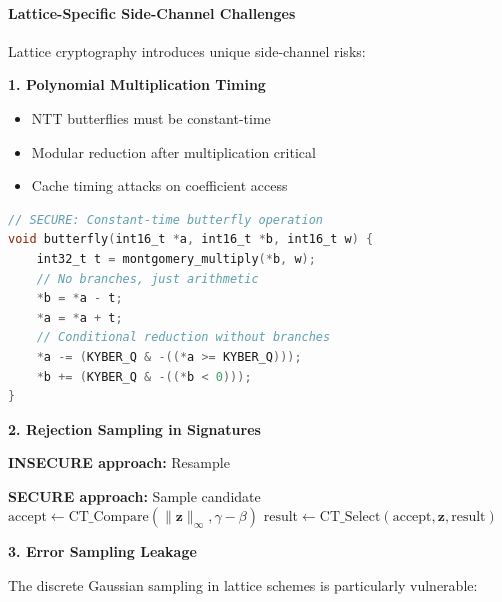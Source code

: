 \documentclass[11pt,a4paper]{article}
\begin{document}
\paragraph{Lattice-Specific Side-Channel Challenges}

Lattice cryptography introduces unique side-channel risks:

\textbf{1. Polynomial Multiplication Timing}
\begin{itemize}
    \item NTT butterflies must be constant-time
    \item Modular reduction after multiplication critical
    \item Cache timing attacks on coefficient access
\end{itemize}

\begin{lstlisting}[language=C, caption=Constant-Time NTT Butterfly]
// SECURE: Constant-time butterfly operation
void butterfly(int16_t *a, int16_t *b, int16_t w) {
    int32_t t = montgomery_multiply(*b, w);
    // No branches, just arithmetic
    *b = *a - t;
    *a = *a + t;
    // Conditional reduction without branches
    *a -= (KYBER_Q & -((*a >= KYBER_Q)));
    *b += (KYBER_Q & -((*b < 0)));
}
\end{lstlisting}

\textbf{2. Rejection Sampling in Signatures}

\begin{algorithm}
\caption{Side-Channel Resistant Rejection Sampling}
\label{alg:ct-rejection}
\begin{algorithmic}[1]
\State \textbf{INSECURE approach:}
    \State Resample 
\EndWhile

\State \textbf{SECURE approach:}
    \State Sample candidate
    \State $\text{accept} \gets \text{CT\_Compare}(\|\mathbf{z}\|_\infty, \gamma - \beta)$
    \State $\text{result} \gets \text{CT\_Select}(\text{accept}, \mathbf{z}, \text{result})$
\EndFor
\State {}
\end{algorithmic}
\end{algorithm}

\textbf{3. Error Sampling Leakage}

The discrete Gaussian sampling in lattice schemes is particularly vulnerable:
\end{document}
